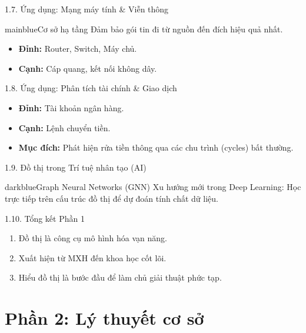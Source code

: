\documentclass[10pt, xcolor={dvipsnames}]{beamer}
\begin{document}
\begin{frame}{1.7. Ứng dụng: Mạng máy tính & Viễn thông}
    \begin{detailbox}{mainblue}{Cơ sở hạ tầng}
        Đảm bảo gói tin đi từ nguồn đến đích hiệu quả nhất.
    \end{detailbox}
    \begin{itemize}
        \item \textbf{Đỉnh:} Router, Switch, Máy chủ.
        \item \textbf{Cạnh:} Cáp quang, kết nối không dây.
    \end{itemize}
\end{frame}

\begin{frame}{1.8. Ứng dụng: Phân tích tài chính & Giao dịch}
    \begin{itemize}
        \item \textbf{Đỉnh:} Tài khoản ngân hàng.
        \item \textbf{Cạnh:} Lệnh chuyển tiền.
        \item \textbf{Mục đích:} Phát hiện rửa tiền thông qua các chu trình (cycles) bất thường.
    \end{itemize}
\end{frame}

\begin{frame}{1.9. Đồ thị trong Trí tuệ nhân tạo (AI)}
    \begin{detailbox}{darkblue}{Graph Neural Networks (GNN)}
        Xu hướng mới trong Deep Learning: Học trực tiếp trên cấu trúc đồ thị để dự đoán tính chất dữ liệu.
    \end{detailbox}
\end{frame}

\begin{frame}{1.10. Tổng kết Phần 1}
    \begin{enumerate}
        \item Đồ thị là công cụ mô hình hóa vạn năng.
        \item Xuất hiện từ MXH đến khoa học cốt lõi.
        \item Hiểu đồ thị là bước đầu để làm chủ giải thuật phức tạp.
    \end{enumerate}
\end{frame}

\section{Phần 2: Lý thuyết cơ sở}
\end{document}
